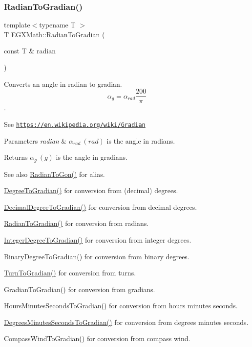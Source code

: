 \subsubsection{\texorpdfstring{Radian\+To\+Gradian()}{RadianToGradian()}}
{\footnotesize\ttfamily template$<$typename T $>$ \\
T E\+G\+X\+Math\+::\+Radian\+To\+Gradian (\begin{DoxyParamCaption}\item[{const T \&}]{radian }\end{DoxyParamCaption})}



Converts an angle in radian to gradian. \[\alpha_{g}=\alpha_{rad}\frac{200}{\pi}\]. 

See \href{https://en.wikipedia.org/wiki/Gradian}{\tt https\+://en.\+wikipedia.\+org/wiki/\+Gradian} 
\begin{DoxyParams}{Parameters}
{\em radian} & $\alpha_{rad}\ (rad)$ is the angle in radians. \\
\hline
\end{DoxyParams}
\begin{DoxyReturn}{Returns}
$\alpha_{g}\ (g)$ is the angle in gradians. 
\end{DoxyReturn}
\begin{DoxySeeAlso}{See also}
\mbox{\hyperlink{group___e_g_x_math-_angle_conversions-_radian_ga36912e5a810b64c271c4dafc17f4ca45}{Radian\+To\+Gon()}} for alias. 

\mbox{\hyperlink{group___e_g_x_math-_angle_conversions-_degree_ga25bb5506b3f66fff7a1b85bf7bd795b3}{Degree\+To\+Gradian()}} for conversion from (decimal) degrees. 

\mbox{\hyperlink{group___e_g_x_math-_angle_conversions-_decimal_degree_ga3ac6f1ceb36a4938cdf3b55554734c99}{Decimal\+Degree\+To\+Gradian()}} for conversion from decimal degrees. 

\mbox{\hyperlink{group___e_g_x_math-_angle_conversions-_radian_ga3c1607eae50cbf0186c42485bb3878d5}{Radian\+To\+Gradian()}} for conversion from radians. 

\mbox{\hyperlink{group___e_g_x_math-_angle_conversions-_integer_degree_ga47127467ff7a8ef57f6be9ce496a97df}{Integer\+Degree\+To\+Gradian()}} for conversion from integer degrees. 

Binary\+Degree\+To\+Gradian() for conversion from binary degrees. 

\mbox{\hyperlink{group___e_g_x_math-_angle_conversions-_turn_gad6aa9bdde2cde17cec136b24ee017bba}{Turn\+To\+Gradian()}} for conversion from turns. 

Gradian\+To\+Gradian() for conversion from gradians. 

\mbox{\hyperlink{group___e_g_x_math-_angle_conversions-_hours_minutes_seconds_ga1731e750f3e5561313ee9d22adff747e}{Hours\+Minutes\+Seconds\+To\+Gradian()}} for conversion from hours minutes seconds. 

\mbox{\hyperlink{group___e_g_x_math-_angle_conversions-_degrees_minutes_seconds_ga59e2c2b178f760c337fcb3ea7406570f}{Degrees\+Minutes\+Seconds\+To\+Gradian()}} for conversion from degrees minutes seconds. 

Compass\+Wind\+To\+Gradian() for conversion from compass wind. 
\end{DoxySeeAlso}
